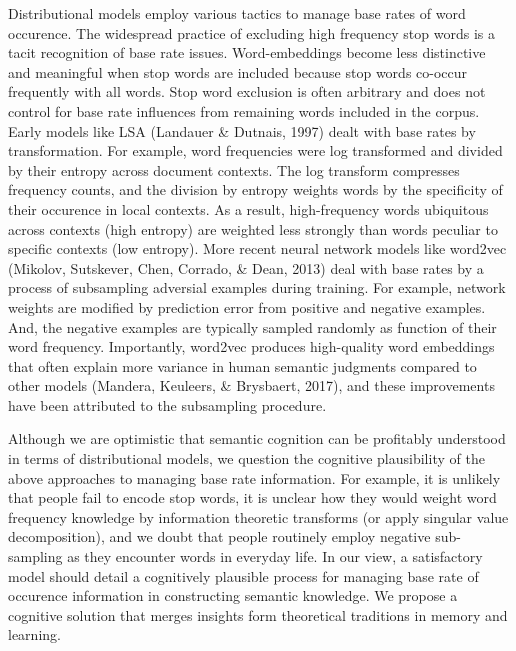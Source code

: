 \documentclass[
  jou]{apa6}
\begin{document}
Distributional models employ various tactics to manage base rates of word occurence. The widespread practice of excluding high frequency stop words is a tacit recognition of base rate issues. Word-embeddings become less distinctive and meaningful when stop words are included because stop words co-occur frequently with all words. Stop word exclusion is often arbitrary and does not control for base rate influences from remaining words included in the corpus. Early models like LSA (Landauer \& Dutnais, 1997) dealt with base rates by transformation. For example, word frequencies were log transformed and divided by their entropy across document contexts. The log transform compresses frequency counts, and the division by entropy weights words by the specificity of their occurence in local contexts. As a result, high-frequency words ubiquitous across contexts (high entropy) are weighted less strongly than words peculiar to specific contexts (low entropy). More recent neural network models like word2vec (Mikolov, Sutskever, Chen, Corrado, \& Dean, 2013) deal with base rates by a process of subsampling adversial examples during training. For example, network weights are modified by prediction error from positive and negative examples. And, the negative examples are typically sampled randomly as function of their word frequency. Importantly, word2vec produces high-quality word embeddings that often explain more variance in human semantic judgments compared to other models (Mandera, Keuleers, \& Brysbaert, 2017), and these improvements have been attributed to the subsampling procedure.

Although we are optimistic that semantic cognition can be profitably understood in terms of distributional models, we question the cognitive plausibility of the above approaches to managing base rate information. For example, it is unlikely that people fail to encode stop words, it is unclear how they would weight word frequency knowledge by information theoretic transforms (or apply singular value decomposition), and we doubt that people routinely employ negative sub-sampling as they encounter words in everyday life. In our view, a satisfactory model should detail a cognitively plausible process for managing base rate of occurence information in constructing semantic knowledge. We propose a cognitive solution that merges insights form theoretical traditions in memory and learning.
\end{document}
